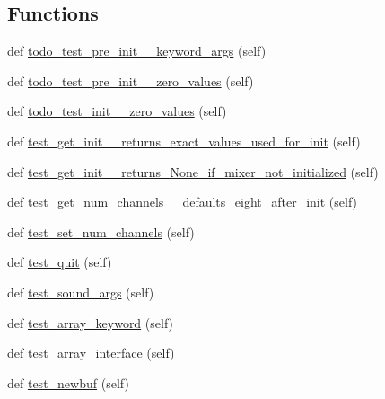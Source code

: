 \subsection*{Functions}
\begin{DoxyCompactItemize}
\item 
def \hyperlink{namespacepygame_1_1tests_1_1mixer__test_a1f4dccc9236a66ad23ffa41dc07b7d7b}{todo\+\_\+test\+\_\+pre\+\_\+init\+\_\+\+\_\+keyword\+\_\+args} (self)
\item 
def \hyperlink{namespacepygame_1_1tests_1_1mixer__test_adc9cd58e84de145780196ddeb5d52161}{todo\+\_\+test\+\_\+pre\+\_\+init\+\_\+\+\_\+zero\+\_\+values} (self)
\item 
def \hyperlink{namespacepygame_1_1tests_1_1mixer__test_ae5d48241ed8c194e335951c4168066da}{todo\+\_\+test\+\_\+init\+\_\+\+\_\+zero\+\_\+values} (self)
\item 
def \hyperlink{namespacepygame_1_1tests_1_1mixer__test_a6604fd70f8d64a4aea17b1d0766975b9}{test\+\_\+get\+\_\+init\+\_\+\+\_\+returns\+\_\+exact\+\_\+values\+\_\+used\+\_\+for\+\_\+init} (self)
\item 
def \hyperlink{namespacepygame_1_1tests_1_1mixer__test_afee4ad57549e7f89ce8eff68a9c9f1c6}{test\+\_\+get\+\_\+init\+\_\+\+\_\+returns\+\_\+\+None\+\_\+if\+\_\+mixer\+\_\+not\+\_\+initialized} (self)
\item 
def \hyperlink{namespacepygame_1_1tests_1_1mixer__test_abd29bcfcb4b7e26c4113bd6abed161bd}{test\+\_\+get\+\_\+num\+\_\+channels\+\_\+\+\_\+defaults\+\_\+eight\+\_\+after\+\_\+init} (self)
\item 
def \hyperlink{namespacepygame_1_1tests_1_1mixer__test_a916e55ce989636b099efed74765ec6d9}{test\+\_\+set\+\_\+num\+\_\+channels} (self)
\item 
def \hyperlink{namespacepygame_1_1tests_1_1mixer__test_aacbdefbefbd04ef544962a826ea32aaf}{test\+\_\+quit} (self)
\item 
def \hyperlink{namespacepygame_1_1tests_1_1mixer__test_a45ef9c22590a71743b78f6a0bae9984d}{test\+\_\+sound\+\_\+args} (self)
\item 
def \hyperlink{namespacepygame_1_1tests_1_1mixer__test_ad23c83b609a27d0b4e97c017c39bb6b0}{test\+\_\+array\+\_\+keyword} (self)
\item 
def \hyperlink{namespacepygame_1_1tests_1_1mixer__test_a70c7cb690ef021e7ce577ceeb79c5532}{test\+\_\+array\+\_\+interface} (self)
\item 
def \hyperlink{namespacepygame_1_1tests_1_1mixer__test_a30b227700a8255013fb50bfdd76af3bd}{test\+\_\+newbuf} (self)

\end{DoxyCompactItemize}

